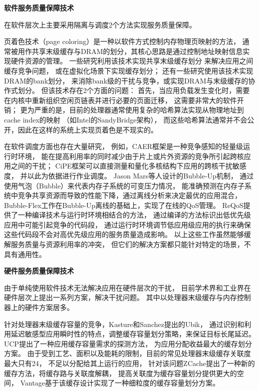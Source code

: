 \iffalse

\textbf{软件服务质量保障技术}\quad

在软件层次上主要采用隔离与调度2个方法实现服务质量保障。

%
%

页着色技术（page coloring）是一种以软件方式控制内存物理页映射的方法，
通常被用作共享末级缓存与DRAM的划分，其核心思路是通过控制地址映射信息实现硬件资源的管理。
一些研究利用该技术实现共享末级缓存划分\cite{lin_gaining_2008, tam_managing_2007}
来解决应用之间缓存竞争问题，
或在虚拟化场景下实现缓存划分\cite{Jin2009, Chen2010, Wang2012}；
还有一些研究\cite{liu_software_2012}使用该技术实现DRAM的bank划分，
来消除bank级的干扰与竞争，或实现DRAM与末级缓存的协作式划分\cite{Liu:2014:ISCA}。
但该技术存在2个方面的问题：
首先，当应用负载发生变化时，需要在内核中重新组织空闲页链表并进行必要的页面迁移，
这需要非常大的软件开销；
更为严重的是，目前的处理器通常使用复杂的哈希算法实现从物理地址到cache index的映射
（如Intel的SandyBridge架构），
而这些哈希算法通常并不会公开，因此在这样的系统上实现页着色是不现实的。

在软件调度方面也存在大量研究，
例如，CAER框架\cite{mars_contention_2010}是一种竞争感知的轻量级运行时环境，
能在提高利用率的同时减少由于片上或片外资源的竞争所引起跨核应用之间的干扰；
CiPE框架\cite{mars_directly_2011}可以直接测量和量化多核结构下应用的跨核干扰敏感度，
并以此为依据进行作业调度。
Jason Mars等人设计的Bubble-Up\cite{mars_bubble-up:_2011}机制，
通过使用气泡（Bubble）来代表内存子系统的可变压力情况，
能准确预测在内存子系统中竞争共享资源而导致的性能下降，通过离线分析来决定最优的应用混合，
Bubble-Flex\cite{yang_bubble-flux:_2013}工作在Bubble-Up离线的基础上，实现了在线的QoS管理。
ReQoS\cite{tang_reqos:_2013}提供了一种编译技术与运行时环境相结合的方法，
通过编译的方法标识出低优先级应用中可能引起竞争的代码段，
通过运行时环境调节低应用级应用的执行来确保这些代码段不会对高优先级应用的服务质量造成影响。
以上这些工作虽然能够缓解服务质量与资源利用率的冲突，
但它们的解决方案都只能针对特定的场景，不具有通用性。


\textbf{硬件服务质量保障技术}\quad

由于单纯使用软件技术无法解决应用在硬件层次的干扰，
目前学术界和工业界在硬件层次上提出一系列方案，解决干扰问题。
其中以处理器末级缓存与内存控制器上的硬件方案居多。

针对处理器末级缓存容量的竞争，Kasture和Sanchez提出的Ubik\cite{kasture_ubik:_2014}，
通过识别和利用延迟敏感型应用瞬时性的特点，调整缓存容量划分策略，来保证目标长尾延迟。
UCP\cite{qureshi_utility-based_2006}提出了一种应用缓存容量需求的探测方法，
为应用分配收益最大的缓存划分方案。
由于受到工艺、面积以及能耗的限制，目前的常见处理器末级缓存关联度最大只有24，
不足以分配给其上运行的应用，
针对该问题ZCache\cite{sanchez_zcache:_2010}提出了一种新的缓存方法，将缓存路与关联度解耦，
提高关联度为缓存容量划分提供更大的空间，
Vantage\cite{sanchez_vantage:_2011}基于该缓存设计实现了一种细粒度的缓存容量划分方案。

